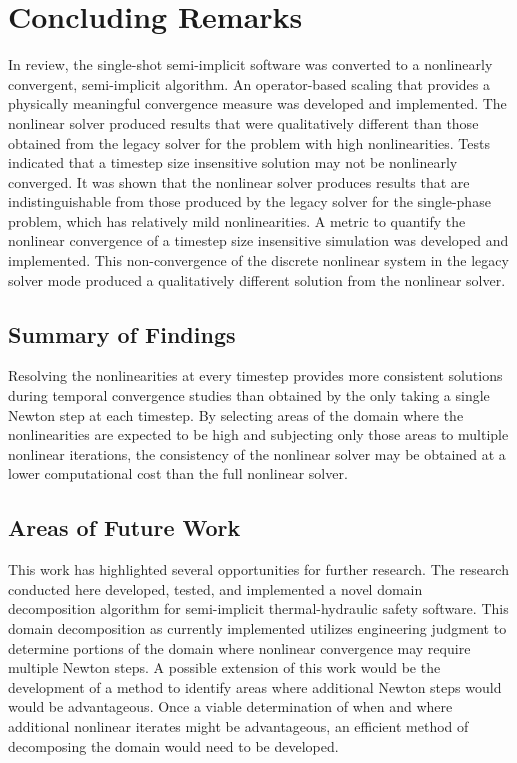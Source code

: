 \chapter{Concluding Remarks}
\label{chap:end}
In review, the single-shot semi-implicit \cobra{} software was converted to a nonlinearly convergent, semi-implicit algorithm.
An operator-based scaling that provides a physically meaningful convergence measure was developed and implemented.
The nonlinear solver produced results that were qualitatively different than those obtained from the legacy solver for the problem with high nonlinearities.
Tests indicated that a timestep size insensitive solution may not be nonlinearly converged.
It was shown that the nonlinear solver produces results that are indistinguishable from those produced by the legacy solver for the single-phase problem, which has relatively mild nonlinearities.
A metric to quantify the nonlinear convergence of a timestep size insensitive simulation was developed and implemented.
This non-convergence of the discrete nonlinear system in the legacy solver mode produced a qualitatively different solution from the nonlinear solver.

\section{Summary of Findings}
\label{sect:end:summary}
Resolving the nonlinearities at every timestep provides more consistent solutions during temporal convergence studies than obtained by the only taking a single Newton step at each timestep.
By selecting areas of the domain where the nonlinearities are expected to be high and subjecting only those areas to multiple nonlinear iterations, the consistency of the nonlinear solver may be obtained at a lower computational cost than the full nonlinear solver.

\section{Areas of Future Work}
\label{sect:futureWork}
This work has highlighted several opportunities for further research.
The research conducted here developed, tested, and implemented a novel domain decomposition algorithm for semi-implicit thermal-hydraulic safety software.
This domain decomposition as currently implemented utilizes engineering judgment to determine portions of the domain where nonlinear convergence may require multiple Newton steps.
A possible extension of this work would be the development of a method to identify areas where additional Newton steps would would be advantageous.
Once a viable determination of when and where additional nonlinear iterates might be advantageous, an efficient method of decomposing the domain would need to be developed.

